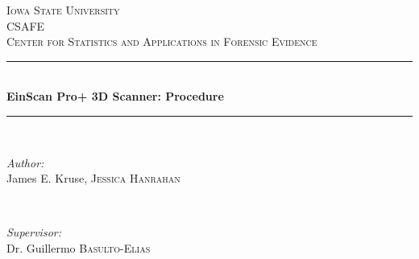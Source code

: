 \begin{titlepage}

\newcommand{\HRule}{\rule{\linewidth}{0.5mm}} %

\center %


\textsc{\LARGE Iowa State University}\\[1.5cm] %
\textsc{\Large CSAFE}\\[0.5cm] %
\textsc{\large Center for Statistics and Applications in Forensic Evidence }\\[0.5cm] %


\HRule \\[0.4cm]
{ \huge \bfseries EinScan Pro+ 3D Scanner: Procedure  }\\[0.4cm] %
\HRule \\[1.5cm]


\begin{minipage}{0.4\textwidth}
\begin{flushleft} \large
\emph{Author:}\\
  James E. Kruse,  \textsc{Jessica Hanrahan} %
\end{flushleft}
\end{minipage}
~
\begin{minipage}{0.4\textwidth}
\begin{flushright} \large
\emph{Supervisor:} \\
Dr. Guillermo \textsc{Basulto-Elias} %
\end{flushright}
\end{minipage}\\[2cm]


\end{titlepage}
